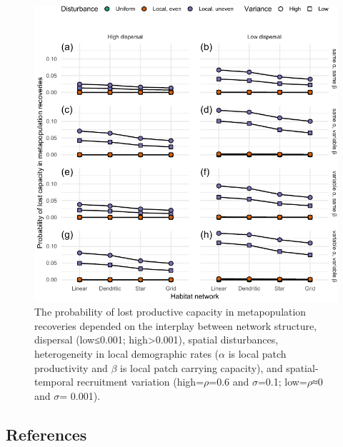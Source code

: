 \documentclass[
]{article}
\begin{document}
\begin{figure}[H]

{\centering \includegraphics{Managing_for_ecological_surprises_in_metapopulations_files/figure-latex/conditional probability for lost capacity-1} 

}

\caption{The probability of lost productive capacity in metapopulation recoveries depended on the interplay between network structure, dispersal (low≤0.001; high>0.001), spatial disturbances, heterogeneity in local demographic rates ($\alpha$ is local patch productivity and $\beta$ is local patch carrying capacity), and spatial-temporal recruitment variation (high=$\rho$=0.6 and $\sigma$=0.1; low=$\rho$≈0 and $\sigma$= 0.001).}\label{fig:conditional probability for lost capacity}
\end{figure}

\hypertarget{references}{%
\subsection{References}\label{references}}

\vspace{3truemm}
\end{document}
